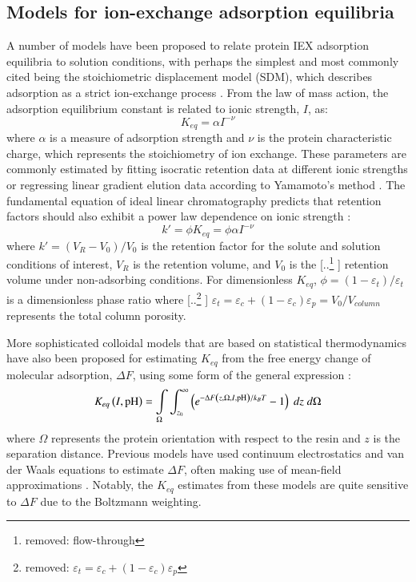 \documentclass[preprint,review,12pt]{elsarticle}
\providecommand{\DIFaddtex}[1]{{\protect\color{blue} \sf #1}} %
\providecommand{\DIFdeltex}[1]{{\protect\color{red} [..\footnote{removed: #1} ]}} %
\providecommand{\DIFaddbegin}{} %
\providecommand{\DIFaddend}{} %
\providecommand{\DIFdelbegin}{} %
\providecommand{\DIFdelend}{} %
\providecommand{\DIFadd}[1]{\texorpdfstring{\DIFaddtex{#1}}{#1}} %
\providecommand{\DIFdel}[1]{\texorpdfstring{\DIFdeltex{#1}}{}} %
\begin{document}
    \subsection{Models for ion-exchange adsorption equilibria} \label{ssec:electrostatics}
        A number of models have been proposed to relate protein IEX adsorption equilibria to solution conditions, with perhaps the simplest and most commonly cited being the stoichiometric displacement model (SDM), which describes adsorption as a strict ion-exchange process \cite{Boardman1955}. From the law of mass action, the adsorption equilibrium constant is related to ionic strength, $I$, as:
        \begin{equation} \label{eq:sdm}
            K_{eq} = \alpha I^{-\nu}
        \end{equation}
        where $\alpha$ is a measure of adsorption strength and $\nu$ is the protein characteristic charge, which represents the stoichiometry of ion exchange. These parameters are commonly estimated by fitting isocratic retention data at different ionic strengths or regressing linear gradient elution data according to Yamamoto's method \cite{Yamamoto1987}. The fundamental equation of ideal linear chromatography predicts that retention factors should also exhibit a power law dependence on ionic strength \cite{Guiochon2006}:
        \begin{equation} \label{eq:fundamental}
            k' = \phi K_{eq} = \phi \alpha I^{-\nu}
        \end{equation}
        where $k' = (V_R - V_0)/V_0$ is the retention factor for the solute and solution conditions of interest, $V_R$ is the retention volume, and $V_0$ is the \DIFdelbegin \DIFdel{flow-through }\DIFdelend \DIFaddbegin \DIFadd{retention }\DIFaddend volume under non-adsorbing conditions. For dimensionless $K_{eq}$, $\phi = (1 - \varepsilon_t)/\varepsilon_t$ is a dimensionless phase ratio where \DIFdelbegin \DIFdel{$\varepsilon_t = \varepsilon_c + (1 - \varepsilon_c) \varepsilon_p$ }\DIFdelend \DIFaddbegin \DIFadd{$\varepsilon_t = \varepsilon_c + (1 - \varepsilon_c) \varepsilon_p = V_0/V_{column}$ }\DIFaddend represents the total column porosity.

        More sophisticated colloidal models that are based on statistical thermodynamics have also been proposed for estimating $K_{eq}$ from the free energy change of molecular adsorption, $\Delta F$, using some form of the general expression \cite{Asthagiri1997}:
        \begin{equation} \label{eq:keq stat thermo}
            K_{eq}\left(I, \mathrm{pH} \right) = \int \displaylimits_\Omega \int_{z_0}^{\infty} \left( e^{-\Delta F \left( z, \Omega, I, \mathrm{pH} \right)/k_BT} - 1 \right) \; dz \; d\Omega
        \end{equation}
        where $\Omega$ represents the protein orientation with respect to the resin and $z$ is the separation distance. Previous models have used continuum electrostatics and van der Waals equations to estimate $\Delta F$, often making use of mean-field approximations \cite{Guelat2012, Briskot2019}. Notably, the $K_{eq}$ estimates from these models are quite sensitive to $\Delta F$ due to the Boltzmann weighting.
\end{document}
